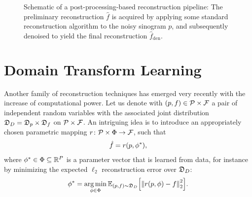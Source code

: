 \documentclass[../ml-ct.tex]{subfiles}
\begin{document}
\begin{figure}
	\caption[Schematic of a post-processing-based reconstruction pipeline.]{
		Schematic of a post-processing-based reconstruction pipeline:
		The preliminary reconstruction \( \hat{f} \) is acquired by applying some standard reconstruction algorithm to the noisy sinogram \( p \), and subsequently denoised to yield the final reconstruction \( \hat{f}_\text{den} \).
	}%
	\label{fig:learning:postprocessing scheme}
\end{figure}
\section{Domain Transform Learning}
Another family of reconstruction techniques has emerged very recently with the increase of computational power.
Let us denote with \( (p, f) \in \mathcal{P} \times \mathcal{F} \) a pair of independent random variables with the associated joint distribution \( \mathfrak{D}_{D} = \mathfrak{D}_{p} \times \mathfrak{D}_{f} \) on \( \mathcal{P} \times \mathcal{F} \).
An intriguing idea is to introduce an appropriately chosen parametric mapping \( r\colon\mathcal{P} \times \Phi\to\mathcal{F} \), such that
\begin{equation}
	\hat{f} = r(p, \optimal{\params}{}),%
	\label{eq:learning:automap mapping}
\end{equation}
where \( \phi^*_{\text{}} \in \Phi \subseteq \mathbb{R}^P \) is a parameter vector that is learned from data, for instance by minimizing the expected \( \ell_2 \) reconstruction error over \(\mathfrak{D}_{D}\):
\begin{equation}
	\optimal{\params}{} = \argmin_{\params\in\Phi} \mathbb{E}_{(p, f) \sim \distr{D}} \Bigl[ \norm{r(p, \params) - f}_2^2 \Bigr].%
	\label{eq:learning:automap learning}
\end{equation}
\end{document}
